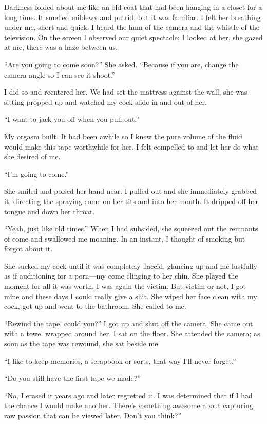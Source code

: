Darkness folded about me like an old coat that had been hanging in a
closet for a long time. It smelled mildewy and putrid, but it was
familiar. I felt her breathing under me, short and quick; I heard the
hum of the camera and the whistle of the television. On the screen I
observed our quiet spectacle; I looked at her, she gazed at me, there
was a haze between us.

``Are you going to come soon?'' She asked. ``Because if you are, change
the camera angle so I can see it shoot.''

I did so and reentered her. We had set the mattress against the wall,
she was sitting propped up and watched my cock slide in and out of her.

``I want to jack you off when you pull out.''

My orgasm built. It had been awhile so I knew the pure volume of the
fluid would make this tape worthwhile for her. I felt compelled to and
let her do what she desired of me.

``I'm going to come.''

She smiled and poised her hand near. I pulled out and she immediately
grabbed it, directing the spraying come on her tits and into her mouth.
It dripped off her tongue and down her throat.

``Yeah, just like old times.'' When I had subsided, she squeezed out the
remnants of come and swallowed me moaning. In an instant, I thought of
smoking but forgot about it.

She sucked my cock until it was completely flaccid, glancing up and me
lustfully as if auditioning for a porn---my come clinging to her chin.
She played the moment for all it was worth, I was again the victim. But
victim or not, I got mine and these days I could really give a shit. She
wiped her face clean with my cock, got up and went to the bathroom. She
called to me.

``Rewind the tape, could you?'' I got up and shut off the camera. She
came out with a towel wrapped around her. I sat on the floor. She
attended the camera; as soon as the tape was rewound, she sat beside me.

``I like to keep memories, a scrapbook or sorts, that way I'll never
forget.''

``Do you still have the first tape we made?''

``No, I erased it years ago and later regretted it. I was determined
that if I had the chance I would make another. There's something awesome
about capturing raw passion that can be viewed later. Don't you think?''

